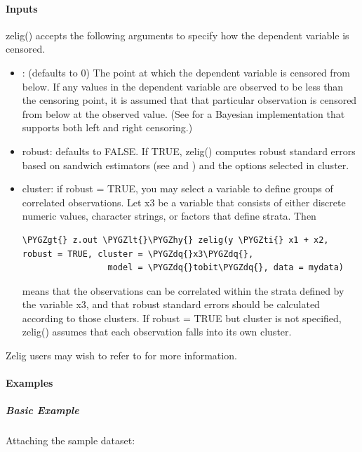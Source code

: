 \documentclass[letterpaper,10pt,english]{sphinxmanual}
\def\PYGZlt{\char`\<}
\def\PYGZgt{\char`\>}
\def\PYGZhy{\char`\-}
\def\PYGZdq{\char`\"}
\def\PYGZti{\char`\~}
\begin{document}
\paragraph{Inputs}
\label{zelig-tobit:inputs}
zelig() accepts the following arguments to specify how the dependent
variable is censored.
\begin{itemize}
\item {} 
: (defaults to 0) The point at which the dependent variable
is censored from below. If any values in the dependent variable are
observed to be less than the censoring point, it is assumed that that
particular observation is censored from below at the observed value.
(See for a Bayesian implementation that supports both left and right
censoring.)

\item {} 
robust: defaults to FALSE. If TRUE, zelig() computes robust standard
errors based on sandwich estimators (see and ) and the options
selected in cluster.

\item {} 
cluster: if robust = TRUE, you may select a variable to define groups
of correlated observations. Let x3 be a variable that consists of
either discrete numeric values, character strings, or factors that
define strata. Then

\begin{Verbatim}[commandchars=\\\{\}]
\PYGZgt{} z.out \PYGZlt{}\PYGZhy{} zelig(y \PYGZti{} x1 + x2, robust = TRUE, cluster = \PYGZdq{}x3\PYGZdq{},
                 model = \PYGZdq{}tobit\PYGZdq{}, data = mydata)
\end{Verbatim}

means that the observations can be correlated within the strata
defined by the variable x3, and that robust standard errors should be
calculated according to those clusters. If robust = TRUE but cluster
is not specified, zelig() assumes that each observation falls into
its own cluster.

\end{itemize}

Zelig users may wish to refer to  for more information.


\paragraph{Examples}
\label{zelig-tobit:examples}

\subparagraph{Basic Example}
\label{zelig-tobit:basic-example}
Attaching the sample dataset:
\end{document}
